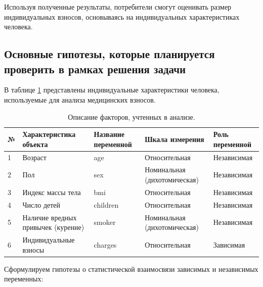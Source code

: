 \documentclass[a4paper,12pt]{article}
\begin{document}
Используя полученные результаты, потребители смогут оценивать размер индивидуальных взносов, основываясь на индивидуальных характеристиках человека.

\subsection{Основные гипотезы, которые планируется проверить в рамках решения задачи}
В таблице \ref{tab:table1} представлены индивидуальные характеристики человека, используемые для анализа медицинских взносов. 

\begin{table}[H]
\begin{center}
	\begin{tabular}{ | l | p{4cm} | p{2.6cm} | p{4.2cm} | p{3.7cm} |}
		\hline
		№ & Характеристика объекта & Название переменной & Шкала измерения & Роль переменной \\ \hline
		1 & Возраст & age & Относительная & Независимая \\ \hline
		2 & Пол & sex & Номинальная (дихотомическая) & Независимая \\ \hline
		3 & Индекс массы тела & bmi & Относительная & Независимая \\ \hline
		4 & Число детей & children & Относительная & Независимая \\ \hline
		5 & Наличие вредных привычек (курение) & smoker & Номинальная (дихотомическая) & Независимая \\ \hline
		6 & Индивидуальные взносы & charges & Относительная & Зависимая \\ \hline
	\end{tabular}
\end{center}
\caption{Описание факторов, учтенных в анализе.}
\label{tab:table1}
\end{table}
Сформулируем гипотезы о статистической взаимосвязи зависимых и независимых переменных:
\end{document}
